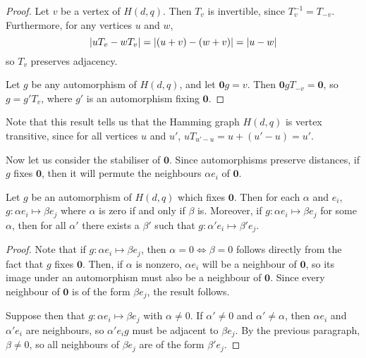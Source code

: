 \documentclass{report}
\newcommand{\wt}[1]{\abs{ #1 }}
\newcommand{\vzero}{\mathbf{0}}
\begin{document}
    \begin{proof}
      Let $v$ be a vertex of $H(d, q)$.  Then $T_v$ is invertible, since
      $T_v^{-1} = T_{-v}$.  Furthermore, for any vertices $u$ and $w$,
      $$
        \wt{uT_v - wT_v}
        = \wt{(u + v) - (w + v)}
        = \wt{u - w}
      $$
      so $T_v$ preserves adjacency.

      Let $g$ be any automorphism of $H(d, q)$, and let $\vzero g = v$.  Then 
      $\vzero g T_{-v} = \vzero$, so $g = g' T_v$, where $g'$ is an automorphism
      fixing $\vzero$.
    \end{proof}

    Note that this result tells us that the Hamming graph $H(d, q)$ is vertex
    transitive, since for all vertices $u$ and $u'$, $u T_{u' - u} = u + (u' -
    u) = u'$.

    Now let us consider the stabiliser of $\vzero$.  Since automorphisms
    preserve distances, if $g$ fixes $\vzero$, then it will permute the
    neighbours $\alpha e_i$ of $\vzero$.

    \begin{lem}\label{lem:hamming-automorphisms-preserve-component}
      Let $g$ be an automorphism  of $H(d, q)$ which fixes $\vzero$.  Then for
      each $\alpha$ and $e_i$, $g: \alpha e_i \mapsto \beta e_j$ where $\alpha$
      is zero if and only if $\beta$ is.
      Moreover, if $g: \alpha e_i \mapsto \beta e_j$ for some $\alpha$, then for
      all $\alpha'$ there exists a $\beta'$ such that $g: \alpha' e_i \mapsto
      \beta' e_j$.
    \end{lem}

    \begin{proof}
      Note that if $g: \alpha e_i \mapsto \beta e_j$, then $\alpha = 0 \iff \beta
      = 0$ follows directly from the fact that $g$ fixes $\vzero$.  Then, if
      $\alpha$ is nonzero, $\alpha e_i$ will be a neighbour of $\vzero$, so its
      image under an automorphism must also be a neighbour of $\vzero$.  Since
      every neighbour of $\vzero$ is of the form $\beta e_j$, the result
      follows.

      Suppose then that $g: \alpha e_i \mapsto \beta e_j$ with $\alpha \neq 0$.
      If $\alpha' \neq 0$ and $\alpha' \neq \alpha$, then $\alpha e_i$ and
      $\alpha' e_i$ are neighbours, so $\alpha' e_i g$ must be adjacent to
      $\beta e_j$.  By the previous paragraph, $\beta \neq 0$, so all neighbours
      of $\beta e_j$ are of the form $\beta' e_j$.
    \end{proof}
\end{document}
